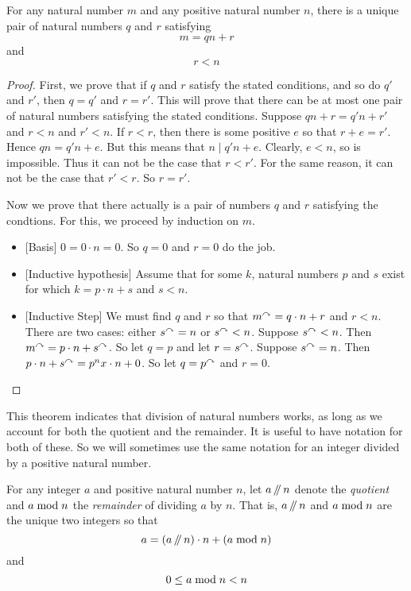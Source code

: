 \begin{thm}\label{thm:division}
	For any natural number $m$ and any positive natural number $n$, there is a unique pair of natural numbers $q$ and $r$ 
	satisfying
	\[m=qn + r\]
	and
	\[r < n\]
 
\begin{proof}
	First, we prove that if $q$ and $r$ satisfy the stated conditions, and so do $q'$ and $r'$, then $q=q'$ and $r=r'$.
	This will prove that there can be at most one pair of natural numbers satisfying the stated conditions.
	Suppose $qn+r = q'n+ r'$ and $r<n$ and $r'<n$. If $r<r$,
	then there is some positive $e$ so that $r+e=r'$. Hence $qn = q'n+e$. But this means that $n \mid q'n+e$. Clearly,
	$e<n$, so is
	impossible. Thus it can not be the case that $r<r'$. For the same reason, it can not be the case that $r'<r$. So $r=r'$. 
	
	Now we prove that there actually is a pair of numbers $q$ and $r$ satisfying the condtions. For this, we proceed by induction
	on $m$.
	\begin{itemize}
		\item{} [Basis] $0=0\cdot n = 0$. So $q=0$ and $r=0$ do the job.
		\item{} [Inductive hypothesis] Assume that for some $k$, natural numbers $p$ and $s$ exist for which $k=p\cdot n+s$ and $s<n$.
		\item{} [Inductive Step] We must find $q$ and $r$ so that $m^\curvearrowright = q\cdot n+r$ and $r<n$. There are two cases: either $s^\curvearrowright = n$
		or $s^\curvearrowright < n$.
		Suppose $s^\curvearrowright < n$. Then $m^\curvearrowright = p\cdot n + s^\curvearrowright$. So let $q=p$ and let $r=s^\curvearrowright$. Suppose $s^\curvearrowright = n$. Then $p\cdot n + s^\curvearrowright = p^nx\cdot n + 0$. So let $q=p^\curvearrowright$ and $r=0$.
	\end{itemize} 
\end{proof}
\end{thm}

This theorem indicates that division of natural numbers works, as long as we account for both the quotient and the remainder. It is useful to have notation for both of these.  So we will sometimes use the same notation for an integer divided by a positive natural number.

\begin{defn}
	For any integer $a$ and positive natural number $n$, let $a\mathop{/\mkern-5mu/} n$ denote the \emph{quotient} and $a\bmod n$ the \emph{remainder} of
	dividing $a$ by $n$. That is, $a\mathop{/\mkern-5mu/} n$ and $a\bmod n$ are the unique two integers so that
	\[a = (a\mathop{/\mkern-5mu/} n)\cdot n + (a\bmod n)\]
	and 
	\[0\leq a\bmod n < n\] 
\end{defn}

